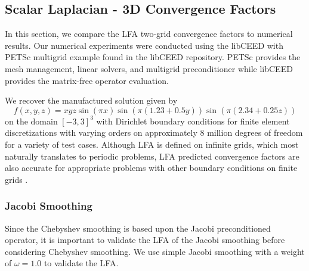 \documentclass[review]{siamart190516}
\begin{document}
\subsection{Scalar Laplacian - 3D Convergence Factors}\label{sec:3dresults}

In this section, we compare the LFA two-grid convergence factors to numerical results.
Our numerical experiments were conducted using the libCEED \cite{libceed-user-manual} with PETSc \cite{petsc-user-ref} multigrid example found in the libCEED repository.
PETSc provides the mesh management, linear solvers, and multigrid preconditioner while libCEED provides the matrix-free operator evaluation.

We recover the manufactured solution given by
\begin{equation}
f \left( x, y, z \right) = x y z \sin \left( \pi x \right) \sin \left( \pi \left( 1.23 + 0.5 y \right) \right) \sin \left( \pi \left( 2.34 + 0.25 z \right) \right)
\end{equation}
on the domain $\left[ -3, 3 \right]^3$ with Dirichlet boundary conditions for finite element discretizations with varying orders on approximately 8 million degrees of freedom for a variety of test cases.
Although LFA is defined on infinite grids, which most naturally translates to periodic problems, LFA predicted convergence factors are also accurate for appropriate problems with other boundary conditions on finite grids \cite{rodrigo2019validity}.

\subsubsection{Jacobi Smoothing}

Since the Chebyshev smoothing is based upon the Jacobi preconditioned operator, it is important to validate the LFA of the Jacobi smoothing before considering Chebyshev smoothing.
We use simple Jacobi smoothing with a weight of $\omega = 1.0$ to validate the LFA.
\end{document}
